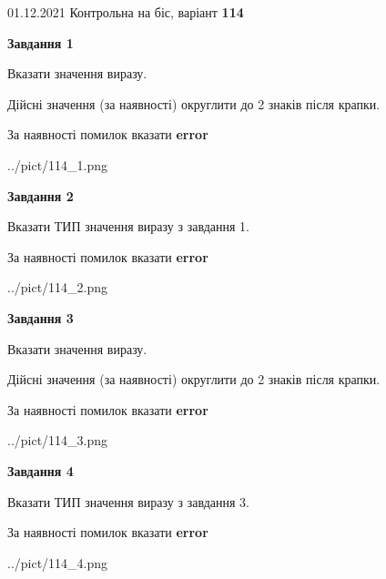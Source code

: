 \documentclass[11pt, ukrainian]{article}
\begin{document}
{01.12.2021 Контрольна на біс, варіант  \No \textbf { 114 }\par}
{
\begin {large}
{\begin {center}\textbf{Завдання 1}\end {center}}\par
Вказати значення виразу. \par
Дійсні значення (за наявності) округлити до 2 знаків після крапки. \par
За наявності помилок вказати \textbf{error}

\begin{center}
	{../pict/114_1.png}
\end{center}
\newpage

{\begin {center}\textbf{Завдання 2}\end {center}}\par
Вказати ТИП значення виразу з завдання 1. \par
За наявності помилок вказати \textbf{error}

\begin{center}
	{../pict/114_2.png}
\end{center}
\newpage

{\begin {center}\textbf{Завдання 3}\end {center}}\par
Вказати значення виразу. \par
Дійсні значення (за наявності) округлити до 2 знаків після крапки. \par
За наявності помилок вказати \textbf{error}

\begin{center}
	{../pict/114_3.png}
\end{center}
\newpage

{\begin {center}\textbf{Завдання 4}\end {center}}\par
Вказати ТИП значення виразу з завдання 3. \par
За наявності помилок вказати \textbf{error}

\begin{center}
	{../pict/114_4.png}
\end{center}
\newpage


\end{large}}
\end{document}
